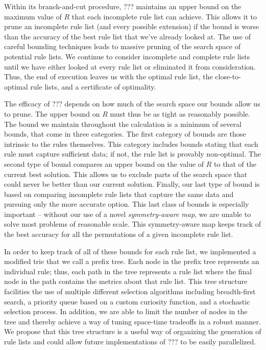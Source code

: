 Within its branch-and-cut procedure, ??? maintains an upper bound on the maximum value of $R$ that each incomplete rule list can achieve. This allows it to prune an incomplete rule list (and every possible extension) if the bound is worse than the accuracy of the best rule list that we've already looked at. The use of careful bounding techniques leads to massive pruning of the search space of potential rule lists. We continue to consider incomplete and complete rule lists until we have either looked at every rule list or eliminated it from consideration. Thus, the end of execution leaves us with the optimal rule list, the close-to-optimal rule lists, and a certificate of optimality.

The efficacy of ??? depends on how much of the search space our bounds allow us to prune. The upper bound on $R$ must thus be as tight as reasonably possible. The bound we maintain throughout the calculation is a minimum of several bounds, that come in three categories. The first category of bounds are those intrinsic to the rules themselves. This category includes bounds stating that each rule must capture sufficient data; if not, the rule list is provably non-optimal. The second type of bound compares an upper bound on the value of $R$ to that of the current best solution. This allows us to exclude parts of the search space that could never be better than our current solution. Finally, our last type of bound is based on comparing incomplete rule lists that capture the same data and pursuing only the more accurate option. This last class of bounds is especially important -- without our use of a novel \textit{symmetry-aware map}, we are unable to solve most problems of reasonable scale. This symmetry-aware map keeps track of the best accuracy for all the permutations of a given incomplete rule list.

In order to keep track of all of these bounds for each rule list, we implemented a modified trie that we call a prefix tree. Each node in the prefix tree represents an individual rule; thus, each path in the tree represents a rule list where the final node in the path contains the metrics about that rule list. This tree structure facilities the use of multiple different selection algorithms including breadth-first search, a priority queue based on a custom curiosity function, and a stochastic selection process. In addition, we are able to limit the number of nodes in the tree and thereby achieve a way of tuning space-time tradeoffs in a robust manner. We propose that this tree structure is a useful way of organizing the generation of rule lists and could allow future implementations of ??? to be easily parallelized.

